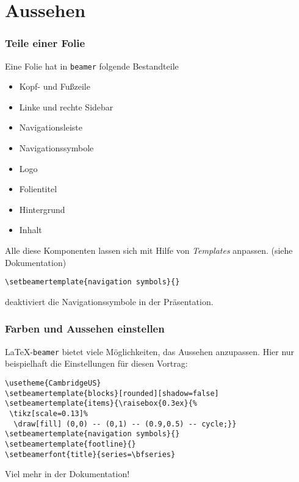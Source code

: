 
\section{Aussehen}

\begin{slide}
  \frametitle{Teile einer Folie}

  \onslide<+->

  Eine Folie hat in \texttt{beamer} folgende Bestandteile
  \begin{itemize}
  \item Kopf- und Fußzeile
  \item Linke und rechte Sidebar
  \item Navigationsleiste
  \item Navigationssymbole
  \item Logo
  \item Folientitel
  \item Hintergrund
  \item Inhalt
  \end{itemize}

  \onslide<+->

  Alle diese Komponenten lassen sich mit Hilfe von \textit{Templates} anpassen. (siehe
  Dokumentation)
  \onslide<+->
  \begin{Beispiel}
\begin{lstlisting}
\setbeamertemplate{navigation symbols}{}
\end{lstlisting}
    deaktiviert die Navigationssymbole in der Präsentation.
  \end{Beispiel}

\end{slide}

\begin{frame}[fragile]
  \frametitle{Farben und Aussehen einstellen}

  \onslide<+->

  \LaTeX-\texttt{beamer} bietet viele Möglichkeiten, das Aussehen anzupassen.  Hier nur
  beispielhaft die Einstellungen für diesen Vortrag: \onslide<+->
\begin{lstlisting}
\usetheme{CambridgeUS}
\setbeamertemplate{blocks}[rounded][shadow=false]
\setbeamertemplate{items}{\raisebox{0.3ex}{%
 \tikz[scale=0.13]%
  \draw[fill] (0,0) -- (0,1) -- (0.9,0.5) -- cycle;}}
\setbeamertemplate{navigation symbols}{}
\setbeamertemplate{footline}{}
\setbeamerfont{title}{series=\bfseries}
\end{lstlisting}
  \onslide<+->

  Viel mehr in der Dokumentation!

\end{frame}

